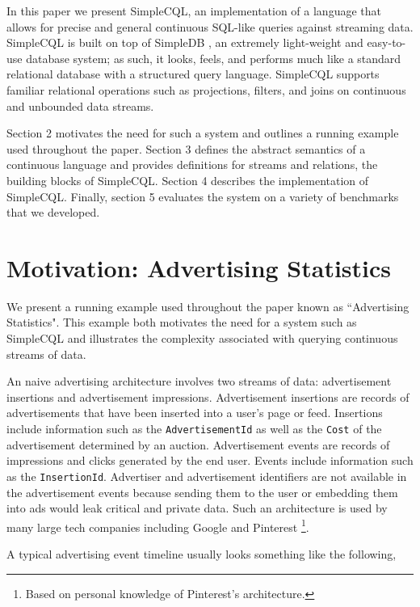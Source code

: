 \documentclass[a4paper, 10pt, conference]{IEEEconf}
\begin{document}
In this paper we present SimpleCQL, an implementation of a language that allows for precise and general continuous SQL-like queries against streaming data.  SimpleCQL is built on top of SimpleDB \cite{simpledb}, an extremely light-weight and easy-to-use database system; as such, it looks, feels, and performs much like a standard relational database with a structured query language. SimpleCQL supports  familiar relational operations such as projections, filters, and joins on continuous and unbounded data streams.

Section 2 motivates the need for such a system and outlines a running example used throughout the paper.  Section 3 defines the abstract semantics of a continuous language and provides definitions for streams and relations, the building blocks of SimpleCQL.  Section 4 describes the implementation of SimpleCQL.  Finally, section 5 evaluates the system on a variety of benchmarks that we developed.


\section{Motivation: Advertising Statistics}
We present a running example used throughout the paper known as ``Advertising Statistics".  This example both motivates the need for a system such as SimpleCQL and illustrates the complexity associated with querying continuous streams of data.

An naive advertising architecture involves two streams of data: advertisement insertions and advertisement impressions.  Advertisement insertions are records of advertisements that have been inserted into a user’s page or feed.  Insertions include information such as the \texttt{AdvertisementId} as well as the \texttt{Cost} of the advertisement determined by an auction.  Advertisement events are records of impressions and clicks generated by the end user.  Events include information such as the \texttt{InsertionId}.  Advertiser and advertisement identifiers are not available in the advertisement events because sending them to the user or embedding them into ads would leak critical and private data. Such an architecture is used by many large tech companies including Google \cite{photon} and Pinterest \footnote{Based on personal knowledge of Pinterest's architecture.}. 


A typical advertising event timeline usually looks something like the following,
\end{document}
